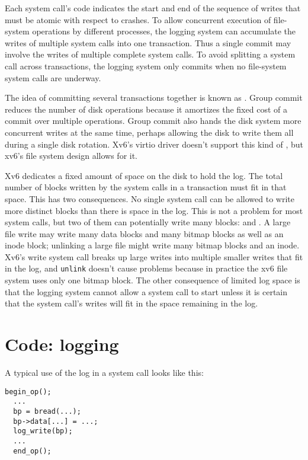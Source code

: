 Each system call's code indicates the start and end of the sequence of
writes that must be atomic with respect to crashes.
To allow concurrent execution of file-system operations
by different processes,
the logging system can accumulate the writes
of multiple system calls into one transaction.
Thus a single commit may involve the writes of multiple
complete system calls.
To avoid splitting a system call across transactions, the logging system
only commits when no file-system system calls are underway.

The idea of committing several transactions together is known as 
.
Group commit reduces the number of disk operations
because it amortizes the fixed cost of a commit over multiple
operations.
Group commit also hands the disk system more concurrent writes
at the same time, perhaps allowing the disk to write
them all during a single disk rotation.
Xv6's virtio driver doesn't support this kind of
,
but xv6's file system design allows for it.

Xv6 dedicates a fixed amount of space on the disk to hold the log.
The total number of blocks written by the system calls in a
transaction must fit in that space.
This has two consequences.
No single system call
can be allowed to write more distinct blocks than there is space
in the log. This is not a problem for most system calls, but two
of them can potentially write many blocks: 
and
.
A large file write may write many data blocks and many bitmap blocks
as well as an inode block; unlinking a large file might write many
bitmap blocks and an inode.
Xv6's write system call breaks up large writes into multiple smaller
writes that fit in the log,
and 
\lstinline{unlink}
doesn't cause problems because in practice the xv6 file system uses
only one bitmap block.
The other consequence of limited log space
is that the logging system cannot allow a system call to start
unless it is certain that the system call's writes will
fit in the space remaining in the log.
\section{Code: logging}

A typical use of the log in a system call looks like this:
\begin{lstlisting}[]
  begin_op();
  ...
  bp = bread(...);
  bp->data[...] = ...;
  log_write(bp);
  ...
  end_op();
\end{lstlisting}

